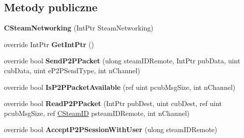 \subsection*{Metody publiczne}
\begin{DoxyCompactItemize}
\item 
\mbox{\label{class_valve_1_1_steamworks_1_1_c_steam_networking_afe12a1be46f448ac0b992137b7cc567f}} 
{\bfseries C\+Steam\+Networking} (Int\+Ptr Steam\+Networking)
\item 
\mbox{\label{class_valve_1_1_steamworks_1_1_c_steam_networking_ad01daf5a0dd9a38f8631b4e09c8532ec}} 
override Int\+Ptr {\bfseries Get\+Int\+Ptr} ()
\item 
\mbox{\label{class_valve_1_1_steamworks_1_1_c_steam_networking_af49b33185613f7442d5fff06848307a7}} 
override bool {\bfseries Send\+P2\+P\+Packet} (ulong steam\+I\+D\+Remote, Int\+Ptr pub\+Data, uint cub\+Data, uint e\+P2\+P\+Send\+Type, int n\+Channel)
\item 
\mbox{\label{class_valve_1_1_steamworks_1_1_c_steam_networking_aca076bc17683ecb0a1ddbc34933147e9}} 
override bool {\bfseries Is\+P2\+P\+Packet\+Available} (ref uint pcub\+Msg\+Size, int n\+Channel)
\item 
\mbox{\label{class_valve_1_1_steamworks_1_1_c_steam_networking_aabd8158ca998000e2aa0afffb0cb7c88}} 
override bool {\bfseries Read\+P2\+P\+Packet} (Int\+Ptr pub\+Dest, uint cub\+Dest, ref uint pcub\+Msg\+Size, ref \hyperlink{struct_valve_1_1_steamworks_1_1_c_steam_i_d}{C\+Steam\+ID} psteam\+I\+D\+Remote, int n\+Channel)
\item 
\mbox{\label{class_valve_1_1_steamworks_1_1_c_steam_networking_a22028f04639b10efb143623842574f00}} 
override bool {\bfseries Accept\+P2\+P\+Session\+With\+User} (ulong steam\+I\+D\+Remote)
\item 
\mbox{\label{class_valve_1_1_steamworks_1_1_c_steam_networking_af1f26286c02806ae4ca7b7ff07bd5203}} 

\end{DoxyCompactItemize}
